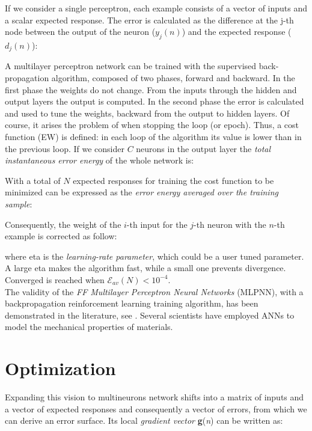 If we consider a single perceptron, each example consists of a vector of inputs
and a scalar expected response.
The error is calculated 
as the difference at the j-th
node between the output of the neuron ($y_j(n)$) and the expected response
($d_j(n)$):

A multilayer perceptron network can be trained with the
supervised back-propagation algorithm, composed of two phases, forward and
backward.
In the first phase the weights do not change. 
From the inputs through the hidden
and output layers the output is computed.
In the second phase the error is calculated 
and used to tune the weights, backward from the output to hidden
layers.
Of course, it arises the problem of when stopping the loop (or epoch). 
Thus, a cost
function (\acs{EW}) is defined: 
in each loop of
the algorithm its value is lower than in the previous loop.
If we consider $C$ neurons in the output layer the 
\textit{total instantaneous error energy} of the whole network is:

With a total of $N$ expected
responses for training the cost function to be minimized can be expressed as the
\textit{error energy averaged over the training sample}:

Consequently, the weight of the $i$-th input for the $j$-th neuron with the
$n$-th example is corrected as follow:

where \acs{eta} is the \textit{learning-rate parameter},
which could be a user tuned parameter. 
A large \acs{eta} makes the algorithm fast,
while a small one prevents divergence.
Converged is reached when $\mathscr{E}_{av}(N) < 10^{-4}$.\\
The validity of the \textit{\acs{FF} Multilayer Perceptron Neural Networks}
(\acs{MLPNN}), with a backpropagation reinforcement learning training algorithm,
has been demonstrated in the 
literature, see \citet{RefWorks:158}. Several scientists 
\cite{RefWorks:161, RefWorks:166, RefWorks:167, RefWorks:168, RefWorks:169,
RefWorks:170, RefWorks:178, RefWorks:179} have employed \acs{ANNs} to model
the mechanical properties of materials.

\section{Optimization}
\label{sec:optimization}

Expanding this vision to multineurons network shifts into a matrix of inputs and
a vector of expected responses and consequently a vector of errors, from which
we can derive an error surface. Its local \textit{gradient vector}
\textbf{g}(\textit{n}) can be written as:

